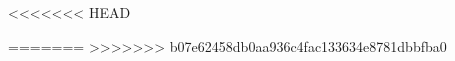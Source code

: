\documentclass{article}
\begin{document}







<<<<<<< HEAD

=======
>>>>>>> b07e62458db0aa936c4fac133634e8781dbbfba0


\end{document}
